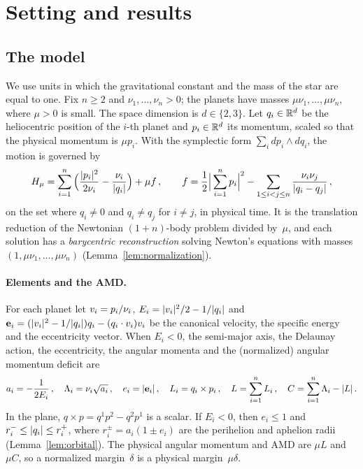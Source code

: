 \section{Setting and results}\label{sec:results}

\subsection{The model}

We use units in which the gravitational constant and the mass of the star are equal to one. Fix $n\geq 2$ and $\nu_1,\ldots,\nu_n>0$; the planets have masses $\mu\nu_1,\ldots,\mu\nu_n$, where $\mu>0$ is small. The space dimension is $d\in\{2,3\}$. Let $q_i\in\mathbb{R}^d$ be the heliocentric position of the $i$-th planet and $p_i\in\mathbb{R}^d$ its momentum, scaled so that the physical momentum is $\mu p_i$. With the symplectic form $\sum_i dp_i\wedge dq_i$, the motion is governed by
\begin{equation}\label{eq:H}
H_\mu=\sum_{i=1}^n\Big(\frac{\lvert p_i\rvert^2}{2\nu_i}-\frac{\nu_i}{\lvert q_i\rvert}\Big)+\mu f\,, \qquad f=\frac12\Big|\sum_{i=1}^n p_i\Big|^2-\sum_{1\leq i<j\leq n}\frac{\nu_i\nu_j}{\lvert q_i-q_j\rvert}\,,
\end{equation}
on the set where $q_i\neq0$ and $q_i\neq q_j$ for $i\neq j$, in physical time. It is the translation reduction of the Newtonian $(1+n)$-body problem divided by~$\mu$, and each solution has a \emph{barycentric reconstruction} solving Newton's equations with masses $(1,\mu\nu_1,\ldots,\mu\nu_n)$ (Lemma~\ref{lem:normalization}).

\paragraph{Elements and the AMD.} For each planet let $v_i=p_i/\nu_i$, $E_i=\lvert v_i\rvert^2/2-1/\lvert q_i\rvert$ and $\mathbf{e}_i=(\lvert v_i\rvert^2-1/\lvert q_i\rvert)q_i-(q_i\cdot v_i)v_i$ be the canonical velocity, the specific energy and the eccentricity vector. When $E_i<0$, the semi-major axis, the Delaunay action, the eccentricity, the angular momenta and the (normalized) angular momentum deficit are
\begin{equation}\label{eq:elements}
a_i=-\frac{1}{2E_i}\,,\quad \Lambda_i=\nu_i\sqrt{a_i}\,,\quad e_i=\lvert \mathbf{e}_i\rvert\,,\quad L_i=q_i\times p_i\,,\quad L=\sum_{i=1}^n L_i\,,\quad C=\sum_{i=1}^n\Lambda_i-\lvert L\rvert\,.
\end{equation}
In the plane, $q\times p=q^1p^2-q^2p^1$ is a scalar. If $E_i<0$, then $e_i\leq1$ and $r_i^-\leq\lvert q_i\rvert\leq r_i^+$, where $r_i^\pm=a_i(1\pm e_i)$ are the perihelion and aphelion radii (Lemma~\ref{lem:orbital}). The physical angular momentum and AMD are $\mu L$ and $\mu C$, so a normalized margin~$\delta$ is a physical margin~$\mu\delta$.

